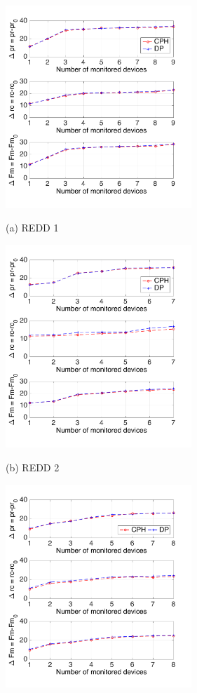 \begin{figure}[htb]
\begin{minipage}[b]{0.48\linewidth}
  \centering
  \centerline{\includegraphics[width=7cm]{./chapters/chapter5/images/R1_kp_nmodev.pdf}}
  \centerline{(a) REDD 1}\medskip
\end{minipage}
%
\hfill
\begin{minipage}[b]{.48\linewidth}
  \centering
  \centerline{\includegraphics[width=7cm]{./chapters/chapter5/images/R2_kp_nmodev.pdf}}
  \centerline{(b) REDD 2}\medskip
\end{minipage}
\begin{minipage}[b]{.48\linewidth}
  \centering
  \centerline{\includegraphics[width=7cm]{./chapters/chapter5/images/UK_kp_nmodev.pdf}}

\end{minipage}
\end{figure}
